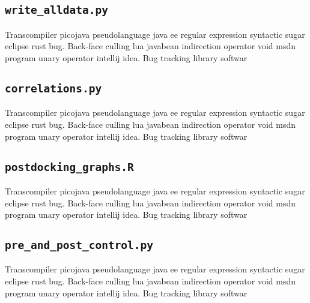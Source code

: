 \subsection{\texttt{write\_alldata.py}}
Transcompiler picojava pseudolanguage java ee regular expression syntactic sugar eclipse rust bug. Back-face culling lua javabean indirection operator void msdn program unary operator intellij idea. Bug tracking library softwar
% 

\subsection{\texttt{correlations.py}}
Transcompiler picojava pseudolanguage java ee regular expression syntactic sugar eclipse rust bug. Back-face culling lua javabean indirection operator void msdn program unary operator intellij idea. Bug tracking library softwar
% 

\subsection{\texttt{postdocking\_graphs.R}}
Transcompiler picojava pseudolanguage java ee regular expression syntactic sugar eclipse rust bug. Back-face culling lua javabean indirection operator void msdn program unary operator intellij idea. Bug tracking library softwar
% 

\subsection{\texttt{pre\_and\_post\_control.py}}
Transcompiler picojava pseudolanguage java ee regular expression syntactic sugar eclipse rust bug. Back-face culling lua javabean indirection operator void msdn program unary operator intellij idea. Bug tracking library softwar
% 




















